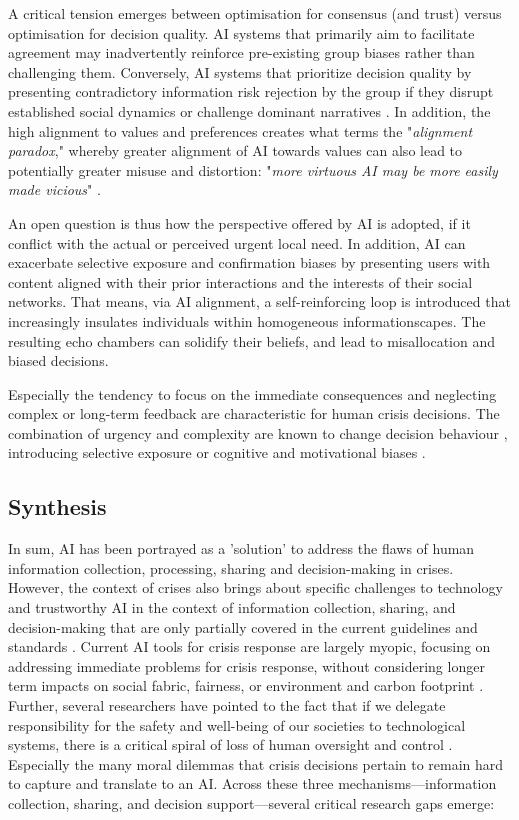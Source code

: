 \documentclass[pdflatex,sn-apa]{sn-jnl}%
\begin{document}
A critical tension emerges between optimisation for consensus (and trust) versus optimisation for decision quality. AI systems that primarily aim to facilitate agreement may inadvertently reinforce pre-existing group biases rather than challenging them. Conversely, AI systems that prioritize decision quality by presenting contradictory information risk rejection by the group if they disrupt established social dynamics or challenge dominant narratives \citep{manzini2024should}. In addition, the high alignment to values and preferences creates what \citet{west2025ai} terms the "\textit{alignment paradox}," whereby greater alignment of AI towards values can also lead to potentially greater misuse and distortion: "\textit{more virtuous AI may be more easily made vicious}" \citep{west2025ai}.



An open question is thus how the perspective offered by AI is adopted, if it conflict with the actual or perceived urgent local need. In addition, AI can exacerbate selective exposure and confirmation biases by presenting users with content aligned with their prior interactions and the interests of their social networks. That means, via AI alignment, a self-reinforcing loop is introduced that increasingly insulates individuals within homogeneous informationscapes. The resulting echo chambers can solidify their beliefs, and lead to misallocation and biased decisions. 

Especially the tendency to focus on the immediate consequences and neglecting complex or long-term feedback \citep{comes2020coordination} are characteristic for human crisis decisions. The combination of urgency and complexity are known to change decision behaviour \citep{klein2010rapid}, introducing selective exposure \citep{barbera2015tweeting} or cognitive and motivational biases \citep{paulus2024interplay}. 

\subsection{Synthesis}
In sum, AI has been portrayed as a 'solution' to address the flaws of human information collection, processing, sharing and decision-making in crises. However, the context of crises also brings about specific challenges to technology and trustworthy AI in the context of information collection, sharing, and decision-making that are only partially covered in the current guidelines and standards \citep{ozmen2023six}. Current AI tools for crisis response are largely myopic, focusing on addressing immediate problems for crisis response, without considering longer term impacts on social fabric, fairness, or environment and carbon footprint \citep{harika2024harnessing}. Further, several researchers have pointed to the fact that if we delegate responsibility for the safety and well-being of our societies to technological systems, there is a critical spiral of loss of human oversight and control \citep{comes2024ai}. Especially the many moral dilemmas that crisis decisions pertain to remain hard to capture and translate to an AI. Across these three mechanisms—information collection, sharing, and decision support—several critical research gaps emerge:
\end{document}

